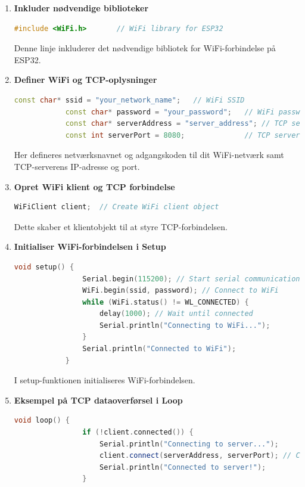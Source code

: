 \documentclass[12pt,a4paper]{book}
\begin{document}
	\begin{enumerate}
		\item \textbf{Inkluder nødvendige biblioteker}
		\begin{lstlisting}[language=C++, caption=Syntaks]
			#include <WiFi.h>       // WiFi library for ESP32
		\end{lstlisting}
		\noindent Denne linje inkluderer det nødvendige bibliotek for WiFi-forbindelse på ESP32.
		
		\item \textbf{Definer WiFi og TCP-oplysninger}
		\begin{lstlisting}[language=C++, caption=Syntaks]
			const char* ssid = "your_network_name";   // WiFi SSID
			const char* password = "your_password";   // WiFi password
			const char* serverAddress = "server_address"; // TCP server IP address
			const int serverPort = 8080;              // TCP server port
		\end{lstlisting}
		\noindent Her defineres netværksnavnet og adgangskoden til dit WiFi-netværk samt TCP-serverens IP-adresse og port.
		
		\item \textbf{Opret WiFi klient og TCP forbindelse}
		\begin{lstlisting}[language=C++, caption=Syntaks]
			WiFiClient client;  // Create WiFi client object
		\end{lstlisting}
		\noindent Dette skaber et klientobjekt til at styre TCP-forbindelsen.
		
		\item \textbf{Initialiser WiFi-forbindelsen i Setup}
		\begin{lstlisting}[language=C++, caption=Syntaks]
			void setup() {
				Serial.begin(115200); // Start serial communication
				WiFi.begin(ssid, password); // Connect to WiFi
				while (WiFi.status() != WL_CONNECTED) {
					delay(1000); // Wait until connected
					Serial.println("Connecting to WiFi...");
				}
				Serial.println("Connected to WiFi");
			}
		\end{lstlisting}
		\noindent I setup-funktionen initialiseres WiFi-forbindelsen.
		
		\item \textbf{Eksempel på TCP dataoverførsel i Loop}
		\begin{lstlisting}[language=C++, caption=Syntaks]
			void loop() {
				if (!client.connected()) {
					Serial.println("Connecting to server...");
					client.connect(serverAddress, serverPort); // Connect to TCP server
					Serial.println("Connected to server!");
				}
				

\end{lstlisting}
\end{enumerate}
\end{document}
